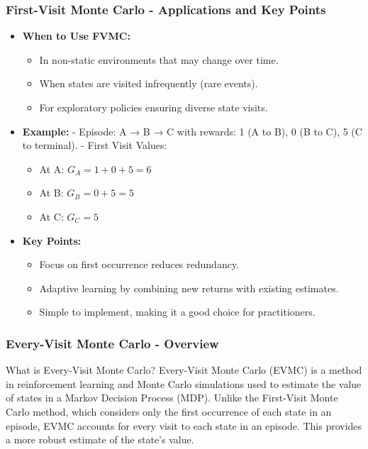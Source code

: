 \documentclass[aspectratio=169]{beamer}
\begin{document}
\begin{frame}[fragile]
    \frametitle{First-Visit Monte Carlo - Applications and Key Points}
    \begin{itemize}
        \item \textbf{When to Use FVMC:}
        \begin{itemize}
            \item In non-static environments that may change over time.
            \item When states are visited infrequently (rare events).
            \item For exploratory policies ensuring diverse state visits.
        \end{itemize}
        
        \item \textbf{Example:} 
        - Episode: A → B → C with rewards: 1 (A to B), 0 (B to C), 5 (C to terminal).
        - First Visit Values:
        \begin{itemize}
            \item At A: \( G_A = 1 + 0 + 5 = 6 \)
            \item At B: \( G_B = 0 + 5 = 5 \)
            \item At C: \( G_C = 5 \)
        \end{itemize}
        
        \item \textbf{Key Points:}
        \begin{itemize}
            \item Focus on first occurrence reduces redundancy.
            \item Adaptive learning by combining new returns with existing estimates.
            \item Simple to implement, making it a good choice for practitioners.
        \end{itemize}
    \end{itemize}
\end{frame}

\begin{frame}[fragile]
    \frametitle{Every-Visit Monte Carlo - Overview}
    \begin{block}{What is Every-Visit Monte Carlo?}
        Every-Visit Monte Carlo (EVMC) is a method in reinforcement learning and Monte Carlo simulations used to estimate the value of states in a Markov Decision Process (MDP). Unlike the First-Visit Monte Carlo method, which considers only the first occurrence of each state in an episode, EVMC accounts for every visit to each state in an episode. This provides a more robust estimate of the state’s value.
    \end{block}
\end{frame}
\end{document}
